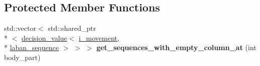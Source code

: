 \subsection*{Protected Member Functions}
\begin{DoxyCompactItemize}
\item 
\hypertarget{classmae_1_1fl_1_1laban_1_1decision__forest_a5f9b65880490f9c3a18360ef29803d7e}{std\-::vector$<$ std\-::shared\-\_\-ptr\\*
$<$ \hyperlink{classmae_1_1fl_1_1laban_1_1decision__value}{decision\-\_\-value}$<$ \hyperlink{classmae_1_1fl_1_1laban_1_1i__movement}{i\-\_\-movement}, \\*
\hyperlink{classmae_1_1fl_1_1laban_1_1laban__sequence}{laban\-\_\-sequence} $>$ $>$ $>$ {\bfseries get\-\_\-sequences\-\_\-with\-\_\-empty\-\_\-column\-\_\-at} (int body\-\_\-part)}\label{classmae_1_1fl_1_1laban_1_1decision__forest_a5f9b65880490f9c3a18360ef29803d7e}

\end{DoxyCompactItemize}


